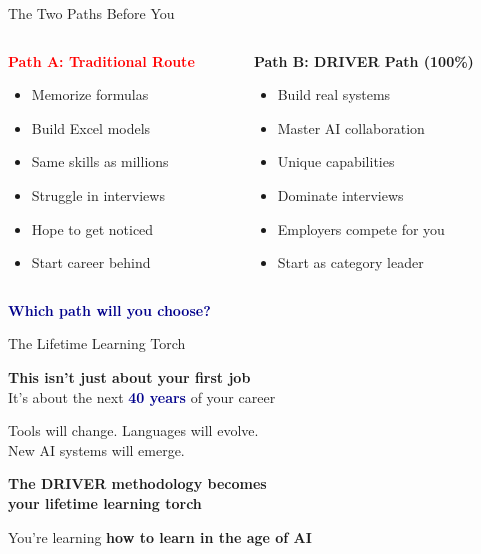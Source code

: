 \documentclass[aspectratio=169,12pt]{beamer}
\begin{document}
\begin{frame}{The Two Paths Before You}
\vspace{0.2cm}
\begin{columns}
\begin{column}{0.5\textwidth}
\textbf{\textcolor{red}{Path A: Traditional Route}}
\footnotesize
\begin{itemize}
\item Memorize formulas
\item Build Excel models
\item Same skills as millions
\item Struggle in interviews
\item Hope to get noticed
\item Start career behind
\end{itemize}
\end{column}
\begin{column}{0.5\textwidth}
\textbf{\textcolor{successgreen}{Path B: DRIVER Path (100\%)}}
\footnotesize
\begin{itemize}
\item Build real systems
\item Master AI collaboration
\item Unique capabilities
\item Dominate interviews
\item Employers compete for you
\item Start as category leader
\end{itemize}
\end{column}
\end{columns}

\vspace{0.3cm}
\begin{center}
\large
\textcolor{darkblue}{\textbf{Which path will you choose?}}
\end{center}
\end{frame}

\begin{frame}{The Lifetime Learning Torch}
\begin{center}
\normalsize
\textbf{This isn't just about your first job}\\
It's about the next \textcolor{darkblue}{\textbf{40 years}} of your career

\vspace{0.3cm}
\small
Tools will change. Languages will evolve.\\
New AI systems will emerge.

\vspace{0.3cm}
\normalsize
\textbf{The DRIVER methodology becomes\\
your \textcolor{successgreen}{lifetime learning torch}}

\vspace{0.2cm}
\small
You're learning \textbf{how to learn in the age of AI}
\end{center}
\end{frame}
\end{document}
